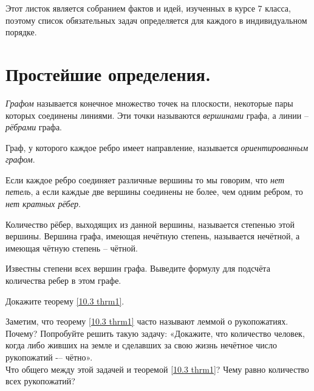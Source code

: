 \noindent
Этот листок является собранием фактов и идей, изученных в курсе 7 класса, поэтому список обязательных задач определяется для каждого в индивидуальном порядке.

\section{Простейшие определения.}

\begin{dfn}
    \textit{Графом} называется конечное множество точек на плоскости, некоторые пары которых соединены линиями. Эти точки называются \textit{вершинами} графа, а линии -- \textit{рёбрами} графа.
\end{dfn}

\begin{dfn}
    Граф, у которого каждое ребро имеет направление, называется \textit{ориентированным} \textit{графом}.
\end{dfn}

\noindent
Если каждое ребро соединяет различные вершины то мы говорим, что \textit{нет петель}, а если каждые две вершины соединены не более, чем одним ребром, то \textit{нет кратных рёбер}.

\begin{dfn}
    Количество рёбер, выходящих из данной вершины, называется степенью этой вершины. Вершина графа, имеющая нечётную степень, называется нечётной, а имеющая чётную степень -- чётной.
\end{dfn}

\begin{ex}
    Известны степени всех вершин графа. Выведите формулу для подсчёта количества ребер в этом графе.
\end{ex}

\begin{center}
\end{center}

\begin{ex}
    Докажите теорему \ref{10.3 thrm1}.
\end{ex}

\noindent
Заметим, что теорему \ref{10.3 thrm1} часто называют леммой о рукопожатиях. Почему? Попробуйте решить такую задачу: «Докажите, что количество человек, когда либо живших на земле и сделавших за свою жизнь нечётное число
рукопожатий -– чётно». 
\\ Что общего между этой задачей и теоремой \ref{10.3 thrm1}? Чему равно количество всех рукопожатий?

